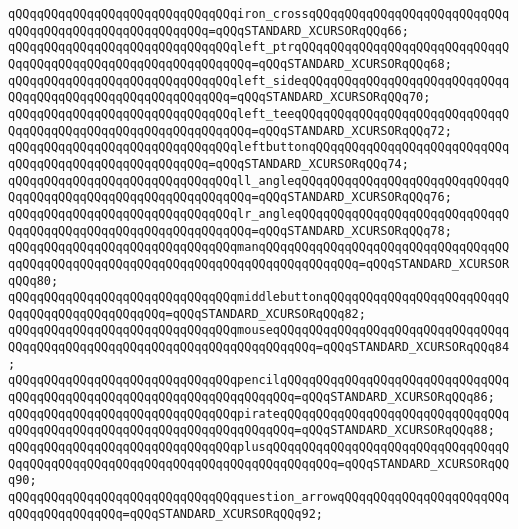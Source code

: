 \verb|qQQqqQQqqQQqqQQqqQQqqQQqqQQqqQQqiron_crossqQQqqQQqqQQqqQQqqQQqqQQqqQQqqQQqqQQqqQQqqQQqqQQqqQQqqQQq=qQQqSTANDARD_XCURSORqQQq66;|\newline
\verb|qQQqqQQqqQQqqQQqqQQqqQQqqQQqqQQqleft_ptrqQQqqQQqqQQqqQQqqQQqqQQqqQQqqQQqqQQqqQQqqQQqqQQqqQQqqQQqqQQqqQQq=qQQqSTANDARD_XCURSORqQQq68;|\newline
\verb|qQQqqQQqqQQqqQQqqQQqqQQqqQQqqQQqleft_sideqQQqqQQqqQQqqQQqqQQqqQQqqQQqqQQqqQQqqQQqqQQqqQQqqQQqqQQqqQQq=qQQqSTANDARD_XCURSORqQQq70;|\newline
\verb|qQQqqQQqqQQqqQQqqQQqqQQqqQQqqQQqleft_teeqQQqqQQqqQQqqQQqqQQqqQQqqQQqqQQqqQQqqQQqqQQqqQQqqQQqqQQqqQQqqQQq=qQQqSTANDARD_XCURSORqQQq72;|\newline
\verb|qQQqqQQqqQQqqQQqqQQqqQQqqQQqqQQqleftbuttonqQQqqQQqqQQqqQQqqQQqqQQqqQQqqQQqqQQqqQQqqQQqqQQqqQQqqQQq=qQQqSTANDARD_XCURSORqQQq74;|\newline
\verb|qQQqqQQqqQQqqQQqqQQqqQQqqQQqqQQqll_angleqQQqqQQqqQQqqQQqqQQqqQQqqQQqqQQqqQQqqQQqqQQqqQQqqQQqqQQqqQQqqQQq=qQQqSTANDARD_XCURSORqQQq76;|\newline
\verb|qQQqqQQqqQQqqQQqqQQqqQQqqQQqqQQqlr_angleqQQqqQQqqQQqqQQqqQQqqQQqqQQqqQQqqQQqqQQqqQQqqQQqqQQqqQQqqQQqqQQq=qQQqSTANDARD_XCURSORqQQq78;|\newline
\verb|qQQqqQQqqQQqqQQqqQQqqQQqqQQqqQQqmanqQQqqQQqqQQqqQQqqQQqqQQqqQQqqQQqqQQqqQQqqQQqqQQqqQQqqQQqqQQqqQQqqQQqqQQqqQQqqQQqqQQq=qQQqSTANDARD_XCURSORqQQq80;|\newline
\verb|qQQqqQQqqQQqqQQqqQQqqQQqqQQqqQQqmiddlebuttonqQQqqQQqqQQqqQQqqQQqqQQqqQQqqQQqqQQqqQQqqQQqqQQq=qQQqSTANDARD_XCURSORqQQq82;|\newline
\verb|qQQqqQQqqQQqqQQqqQQqqQQqqQQqqQQqmouseqQQqqQQqqQQqqQQqqQQqqQQqqQQqqQQqqQQqqQQqqQQqqQQqqQQqqQQqqQQqqQQqqQQqqQQqqQQq=qQQqSTANDARD_XCURSORqQQq84;|\newline
\verb|qQQqqQQqqQQqqQQqqQQqqQQqqQQqqQQqpencilqQQqqQQqqQQqqQQqqQQqqQQqqQQqqQQqqQQqqQQqqQQqqQQqqQQqqQQqqQQqqQQqqQQqqQQq=qQQqSTANDARD_XCURSORqQQq86;|\newline
\verb|qQQqqQQqqQQqqQQqqQQqqQQqqQQqqQQqpirateqQQqqQQqqQQqqQQqqQQqqQQqqQQqqQQqqQQqqQQqqQQqqQQqqQQqqQQqqQQqqQQqqQQqqQQq=qQQqSTANDARD_XCURSORqQQq88;|\newline
\verb|qQQqqQQqqQQqqQQqqQQqqQQqqQQqqQQqplusqQQqqQQqqQQqqQQqqQQqqQQqqQQqqQQqqQQqqQQqqQQqqQQqqQQqqQQqqQQqqQQqqQQqqQQqqQQqqQQq=qQQqSTANDARD_XCURSORqQQq90;|\newline
\verb|qQQqqQQqqQQqqQQqqQQqqQQqqQQqqQQqquestion_arrowqQQqqQQqqQQqqQQqqQQqqQQqqQQqqQQqqQQqqQQq=qQQqSTANDARD_XCURSORqQQq92;|\newline
